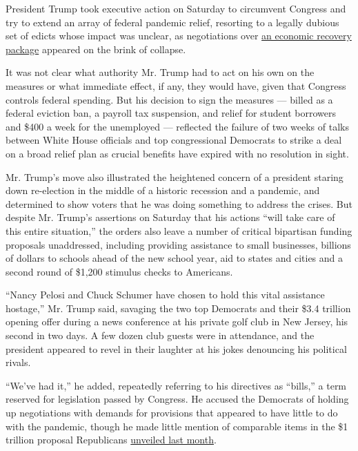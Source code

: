 President Trump took executive action on Saturday to circumvent Congress
and try to extend an array of federal pandemic relief, resorting to a
legally dubious set of edicts whose impact was unclear, as negotiations
over
\href{https://www.nytimes.com/2020/08/08/world/coronavirus-updates.html}{an
economic recovery package} appeared on the brink of collapse.

It was not clear what authority Mr. Trump had to act on his own on the
measures or what immediate effect, if any, they would have, given that
Congress controls federal spending. But his decision to sign the
measures --- billed as a federal eviction ban, a payroll tax suspension,
and relief for student borrowers and \$400 a week for the unemployed ---
reflected the failure of two weeks of talks between White House
officials and top congressional Democrats to strike a deal on a broad
relief plan as crucial benefits have expired with no resolution in
sight.

Mr. Trump's move also illustrated the heightened concern of a president
staring down re-election in the middle of a historic recession and a
pandemic, and determined to show voters that he was doing something to
address the crises. But despite Mr. Trump's assertions on Saturday that
his actions ``will take care of this entire situation,'' the orders also
leave a number of critical bipartisan funding proposals unaddressed,
including providing assistance to small businesses, billions of dollars
to schools ahead of the new school year, aid to states and cities and a
second round of \$1,200 stimulus checks to Americans.

``Nancy Pelosi and Chuck Schumer have chosen to hold this vital
assistance hostage,'' Mr. Trump said, savaging the two top Democrats and
their \$3.4 trillion opening offer during a news conference at his
private golf club in New Jersey, his second in two days. A few dozen
club guests were in attendance, and the president appeared to revel in
their laughter at his jokes denouncing his political rivals.

``We've had it,'' he added, repeatedly referring to his directives as
``bills,'' a term reserved for legislation passed by Congress. He
accused the Democrats of holding up negotiations with demands for
provisions that appeared to have little to do with the pandemic, though
he made little mention of comparable items in the \$1 trillion proposal
Republicans
\href{https://www.nytimes.com/2020/07/27/us/politics/republicans-jobless-aid.html}{unveiled
last month}.

